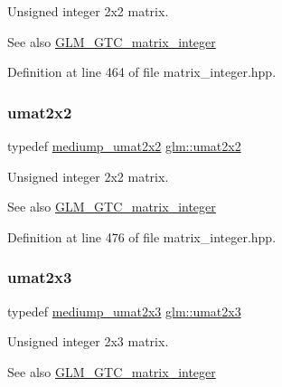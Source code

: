 Unsigned integer 2x2 matrix. \begin{DoxySeeAlso}{See also}
\hyperlink{group__gtc__matrix__integer}{G\+L\+M\+\_\+\+G\+T\+C\+\_\+matrix\+\_\+integer} 
\end{DoxySeeAlso}


Definition at line 464 of file matrix\+\_\+integer.\+hpp.

\mbox{\label{group__gtc__matrix__integer_gad3c997b31dd69bdb4787867e758ed48d}} 
\subsubsection{\texorpdfstring{umat2x2}{umat2x2}}
{\footnotesize\ttfamily typedef \hyperlink{group__gtc__matrix__integer_ga80e478f09c6caa16410198ce78fe8a2b}{mediump\+\_\+umat2x2} \hyperlink{group__gtc__matrix__integer_gad3c997b31dd69bdb4787867e758ed48d}{glm\+::umat2x2}}

Unsigned integer 2x2 matrix. \begin{DoxySeeAlso}{See also}
\hyperlink{group__gtc__matrix__integer}{G\+L\+M\+\_\+\+G\+T\+C\+\_\+matrix\+\_\+integer} 
\end{DoxySeeAlso}


Definition at line 476 of file matrix\+\_\+integer.\+hpp.

\mbox{\label{group__gtc__matrix__integer_ga890ae28f9230794138b2c89f44ce3376}} 
\subsubsection{\texorpdfstring{umat2x3}{umat2x3}}
{\footnotesize\ttfamily typedef \hyperlink{group__gtc__matrix__integer_gaaae45c5dbaad1ecd57bfa936d851be1b}{mediump\+\_\+umat2x3} \hyperlink{group__gtc__matrix__integer_ga890ae28f9230794138b2c89f44ce3376}{glm\+::umat2x3}}

Unsigned integer 2x3 matrix. \begin{DoxySeeAlso}{See also}
\hyperlink{group__gtc__matrix__integer}{G\+L\+M\+\_\+\+G\+T\+C\+\_\+matrix\+\_\+integer} 
\end{DoxySeeAlso}


